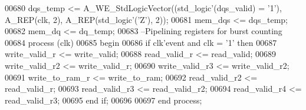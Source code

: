 \begin{DoxyCode}
00680   \textcolor{vhdlchar}{dqs_temp} \textcolor{vhdlchar}{<=} \textcolor{vhdlchar}{A\_WE\_StdLogicVector}\textcolor{vhdlchar}{(}\textcolor{vhdlchar}{(}\textcolor{comment}{std\_logic}\textcolor{vhdlchar}{'}\textcolor{vhdlchar}{(}\textcolor{vhdlchar}{dqs_valid}\textcolor{vhdlchar}{)} \textcolor{vhdlchar}{=} \textcolor{vhdlchar}{'}\textcolor{vhdllogic}{}\textcolor{vhdllogic}{1}\textcolor{vhdlchar}{'}\textcolor{vhdlchar}{)}\textcolor{vhdlchar}{,} \textcolor{vhdlchar}{A\_REP}\textcolor{vhdlchar}{(}\textcolor{vhdlchar}{clk}\textcolor{vhdlchar}{,} \textcolor{vhdllogic}{}\textcolor{vhdllogic}{2}\textcolor{vhdlchar}{)}\textcolor{vhdlchar}{,} \textcolor{vhdlchar}{A\_REP}\textcolor{vhdlchar}{(}\textcolor{comment}{std\_logic}\textcolor{vhdlchar}{'}\textcolor{vhdlchar}{(}\textcolor{vhdlchar}{'}\textcolor{vhdlchar}{Z}\textcolor{vhdlchar}{'}\textcolor{vhdlchar}{)}\textcolor{vhdlchar}{,} \textcolor{vhdllogic}{}\textcolor{vhdllogic}{2}\textcolor{vhdlchar}{)}\textcolor{vhdlchar}{)};
00681   \textcolor{vhdlchar}{mem_dqs} \textcolor{vhdlchar}{<=} \textcolor{vhdlchar}{dqs_temp};
00682   \textcolor{vhdlchar}{mem_dq} \textcolor{vhdlchar}{<=} \textcolor{vhdlchar}{dq_temp};
00683 \textcolor{keyword}{  --Pipelining registers for burst counting}
00684   \textcolor{keywordflow}{process} (clk)
00685 \textcolor{vhdlkeyword}{  begin}
00686     \textcolor{keywordflow}{if} \textcolor{vhdlchar}{clk}\textcolor{vhdlchar}{'}\textcolor{vhdlkeyword}{event} \textcolor{keywordflow}{and} \textcolor{vhdlchar}{clk} \textcolor{vhdlchar}{=} \textcolor{vhdlchar}{'}\textcolor{vhdllogic}{}\textcolor{vhdllogic}{1}\textcolor{vhdlchar}{'} \textcolor{keywordflow}{then}
00687       \textcolor{vhdlchar}{write_valid_r} \textcolor{vhdlchar}{<=} \textcolor{vhdlchar}{write_valid};
00688       \textcolor{vhdlchar}{read_valid_r} \textcolor{vhdlchar}{<=} \textcolor{vhdlchar}{read_valid};
00689       \textcolor{vhdlchar}{write_valid_r2} \textcolor{vhdlchar}{<=} \textcolor{vhdlchar}{write_valid_r};
00690       \textcolor{vhdlchar}{write_valid_r3} \textcolor{vhdlchar}{<=} \textcolor{vhdlchar}{write_valid_r2};
00691       \textcolor{vhdlchar}{write_to_ram_r} \textcolor{vhdlchar}{<=} \textcolor{vhdlchar}{write_to_ram};
00692       \textcolor{vhdlchar}{read_valid_r2} \textcolor{vhdlchar}{<=} \textcolor{vhdlchar}{read_valid_r};
00693       \textcolor{vhdlchar}{read_valid_r3} \textcolor{vhdlchar}{<=} \textcolor{vhdlchar}{read_valid_r2};
00694       \textcolor{vhdlchar}{read_valid_r4} \textcolor{vhdlchar}{<=} \textcolor{vhdlchar}{read_valid_r3};
00695     \textcolor{keywordflow}{end} \textcolor{keywordflow}{if};
00696 
00697   \textcolor{keywordflow}{end} \textcolor{keywordflow}{process};

\end{DoxyCode}
